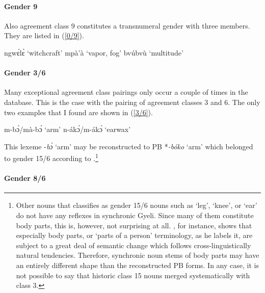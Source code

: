 \paragraph{Gender 9}
Also agreement class 9 constitutes a transnumeral gender with three members. They are listed in (\ref{0/9}).


\begin{exe}
\ex\label{0/9}
\begin{xlist}
\ex ngwɛ́lɛ̀ `witchcraft'
\ex mpà'à `vapor, fog'
\ex bvúbvù `multitude'
\end{xlist}
\end{exe}

\paragraph{Gender 3/6}
Many exceptional agreement class pairings only occur a couple of times in the database. This is the case with the pairing of agreement classes 3 and 6. The only two examples that I found are shown in (\ref{3/6}).


\begin{exe}
\ex\label{3/6}
\begin{xlist}
\ex m-bɔ́/mà-bɔ́ `arm'
\ex n-ákɔ́/m-ákɔ́ `earwax'
\end{xlist}
\end{exe}


\noindent This lexeme -{\itshape bɔ́} `arm' may be reconstructed to PB *{\itshape -bóko} `arm' which belonged to gender 15/6 according to \citet[102]{meeussen67}.\footnote{Other nouns that \citet[102]{meeussen67} classifies as gender 15/6 nouns such as `leg', `knee',  or `ear' do not have any reflexes in synchronic Gyeli. Since many of them constitute body parts, this is, however, not surprising at all. \citet{wilkins96}, for instance, shows that especially body parts, or `parts of a person' terminology, as he labels it, are subject to a great deal of semantic change which follows cross-linguistically natural tendencies. Therefore, synchronic noun stems of body parts may have an entirely different shape than the reconstructed PB forms. In any case, it is not possible to say that historic class 15 nouns merged systematically with class 3.}


\paragraph{Gender 8/6}

